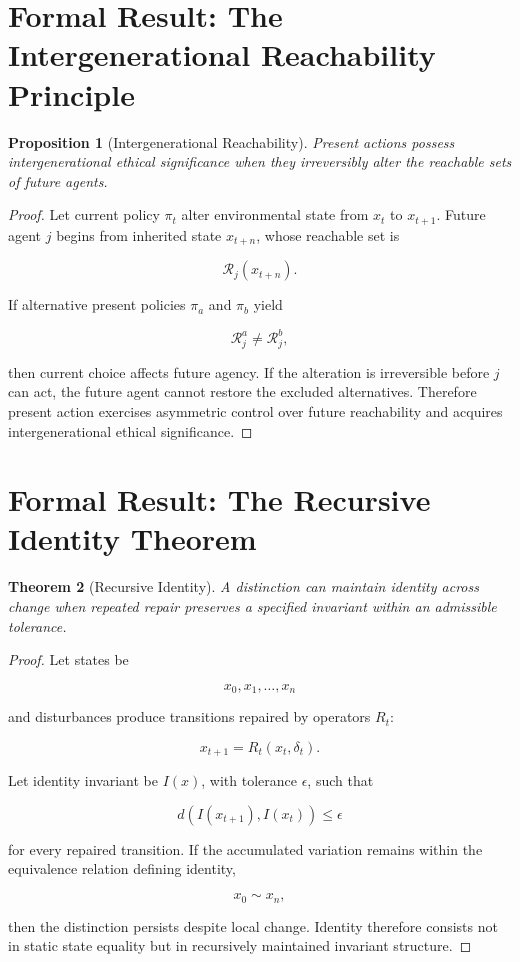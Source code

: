 \documentclass[11pt,oneside]{book}
\newtheorem{theorem}{Theorem}[chapter]
\newtheorem{proposition}[theorem]{Proposition}
\theoremstyle{definition}
\theoremstyle{remark}
\newcommand{\R}{\mathcal{R}}
\begin{document}
\section{Formal Result: The Intergenerational Reachability Principle}

\begin{proposition}[Intergenerational Reachability]
Present actions possess intergenerational ethical significance when they irreversibly alter the reachable sets of future agents.
\end{proposition}

\begin{proof}
Let current policy \(\pi_t\) alter environmental state from \(x_t\) to \(x_{t+1}\). Future agent \(j\) begins from inherited state \(x_{t+n}\), whose reachable set is

\[
\R_j(x_{t+n}).
\]

If alternative present policies \(\pi_a\) and \(\pi_b\) yield

\[
\R_j^{a}\neq\R_j^{b},
\]

then current choice affects future agency. If the alteration is irreversible before \(j\) can act, the future agent cannot restore the excluded alternatives. Therefore present action exercises asymmetric control over future reachability and acquires intergenerational ethical significance.
\end{proof}

\section{Formal Result: The Recursive Identity Theorem}

\begin{theorem}[Recursive Identity]
A distinction can maintain identity across change when repeated repair preserves a specified invariant within an admissible tolerance.
\end{theorem}

\begin{proof}
Let states be

\[
x_0,x_1,\ldots,x_n
\]

and disturbances produce transitions repaired by operators \(R_t\):

\[
x_{t+1}
=
R_t(x_t,\delta_t).
\]

Let identity invariant be \(I(x)\), with tolerance \(\epsilon\), such that

\[
d(I(x_{t+1}),I(x_t))\leq\epsilon
\]

for every repaired transition. If the accumulated variation remains within the equivalence relation defining identity,

\[
x_0\sim x_n,
\]

then the distinction persists despite local change. Identity therefore consists not in static state equality but in recursively maintained invariant structure.
\end{proof}
\end{document}
